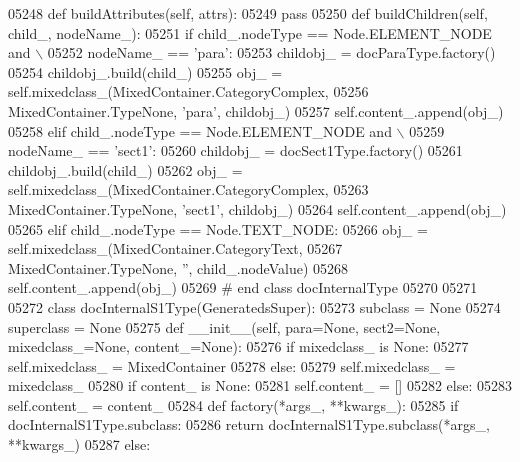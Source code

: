 \begin{DoxyCode}
{{{{{{{{{{{{{{{{{{{{{{{{{{{{{{{{{{{{{{{{{{{{{{{{{{{{{{{{{{{{{{{{{{{{{{{{{{{{{{{{{{{{{{{{{{{{{{{{{{{{{{{{{{{{{{{{{{{{{{{{{{{{{{{{{{{{{{{{{{{{{{{{{{{{{{{{{{{{{{{{{{{{{{{{{{{{{{{{{{{{{{{{{{{{{{{{{{{{{{{{{{{{{{{{{{{{{{{{{{{{{{{{{{{{{{{{{{{{{{{{{{{{{{{{{{{{{{{{{{{{{{{{{{{{{{{{{{{{{{{{{{{{{{{{{{{{{{{{{{{{{{{{{{{{{{{{{{{{{{{{{{{{{{{{{{{{{{{{{{05248     \textcolor{keyword}{def }buildAttributes(self, attrs):
05249         \textcolor{keywordflow}{pass}
05250     \textcolor{keyword}{def }buildChildren(self, child\_, nodeName\_):
05251         \textcolor{keywordflow}{if} child\_.nodeType == Node.ELEMENT\_NODE \textcolor{keywordflow}{and} \(\backslash\)
05252             nodeName\_ == \textcolor{stringliteral}{'para'}:
05253             childobj\_ = docParaType.factory()
05254             childobj\_.build(child\_)
05255             obj\_ = self.mixedclass\_(MixedContainer.CategoryComplex,
05256                 MixedContainer.TypeNone, \textcolor{stringliteral}{'para'}, childobj\_)
05257             self.content\_.append(obj\_)
05258         \textcolor{keywordflow}{elif} child\_.nodeType == Node.ELEMENT\_NODE \textcolor{keywordflow}{and} \(\backslash\)
05259             nodeName\_ == \textcolor{stringliteral}{'sect1'}:
05260             childobj\_ = docSect1Type.factory()
05261             childobj\_.build(child\_)
05262             obj\_ = self.mixedclass\_(MixedContainer.CategoryComplex,
05263                 MixedContainer.TypeNone, \textcolor{stringliteral}{'sect1'}, childobj\_)
05264             self.content\_.append(obj\_)
05265         \textcolor{keywordflow}{elif} child\_.nodeType == Node.TEXT\_NODE:
05266             obj\_ = self.mixedclass\_(MixedContainer.CategoryText,
05267                 MixedContainer.TypeNone, \textcolor{stringliteral}{''}, child\_.nodeValue)
05268             self.content\_.append(obj\_)
05269 \textcolor{comment}{# end class docInternalType}
05270 
05271 
05272 \textcolor{keyword}{class }docInternalS1Type(GeneratedsSuper):
05273     subclass = \textcolor{keywordtype}{None}
05274     superclass = \textcolor{keywordtype}{None}
05275     \textcolor{keyword}{def }__init__(self, para=None, sect2=None, mixedclass\_=None, content\_=None):
05276         \textcolor{keywordflow}{if} mixedclass\_ \textcolor{keywordflow}{is} \textcolor{keywordtype}{None}:
05277             self.mixedclass_ = MixedContainer
05278         \textcolor{keywordflow}{else}:
05279             self.mixedclass_ = mixedclass\_
05280         \textcolor{keywordflow}{if} content\_ \textcolor{keywordflow}{is} \textcolor{keywordtype}{None}:
05281             self.content_ = []
05282         \textcolor{keywordflow}{else}:
05283             self.content_ = content\_
05284     \textcolor{keyword}{def }factory(*args\_, **kwargs\_):
05285         \textcolor{keywordflow}{if} docInternalS1Type.subclass:
05286             \textcolor{keywordflow}{return} docInternalS1Type.subclass(*args\_, **kwargs\_)
05287         \textcolor{keywordflow}{else}:
}}}}}}}}}}}}}}}}}}}}}}}}}}}}}}}}}}}}}}}}}}}}}}}}}}}}}}}}}}}}}}}}}}}}}}}}}}}}}}}}}}}}}}}}}}}}}}}}}}}}}}}}}}}}}}}}}}}}}}}}}}}}}}}}}}}}}}}}}}}}}}}}}}}}}}}}}}}}}}}}}}}}}}}}}}}}}}}}}}}}}}}}}}}}}}}}}}}}}}}}}}}}}}}}}}}}}}}}}}}}}}}}}}}}}}}}}}}}}}}}}}}}}}}}}}}}}}}}}}}}}}}}}}}}}}}}}}}}}}}}}}}}}}}}}}}}}}}}}}}}}}}}}}}}}}}}}}}}}}}}}}}}}}}}}}}}}}}}}}
\end{DoxyCode}
